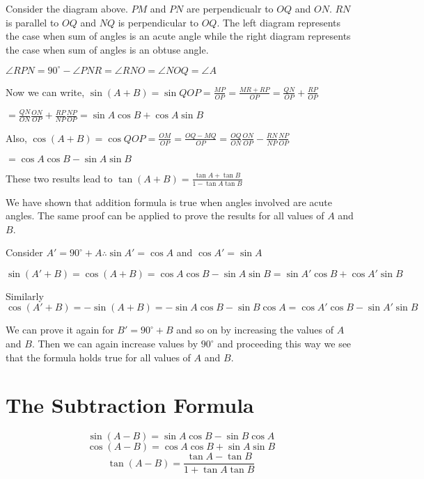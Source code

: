 Consider the diagram above. $PM$ and $PN$ are perpendicualr to $OQ$ and $ON$. $RN$ is parallel to
$OQ$ and $NQ$ is perpendicular to $OQ$. The left diagram represents the case when sum of angles is an acute angle
while the right diagram represents the case when sum of angles is an obtuse angle.

$\angle RPN = 90^{\circ} - \angle PNR = \angle RNO = \angle NOQ = \angle A$

Now we can write, $\sin(A + B) = \sin QOP = \frac{MP}{OP} = \frac{MR + RP}{OP} = \frac{QN}{OP} + \frac{RP}{OP}$

$=\frac{QN}{ON}\frac{ON}{OP} + \frac{RP}{NP}\frac{NP}{OP} = \sin A\cos B + \cos A\sin B$

Also, $\cos(A + B) = \cos QOP = \frac{OM}{OP} = \frac{OQ - MQ}{OP} = \frac{OQ}{ON}\frac{ON}{OP} - \frac{RN}{NP}\frac{NP}{OP}$

$= \cos A\cos B - \sin A\sin B$

These two results lead to $\tan (A + B) = \frac{\tan A + \tan B}{1 - \tan A\tan B}$

We have shown that addition formula is true when angles involved are acute angles. The same proof can be applied to prove the
results for all values of $A$ and $B$.

Consider $A' = 90^{\circ} + A \therefore \sin A' = \cos A$ and $\cos A' = \sin A$

$\sin(A' + B) = \cos (A + B) = \cos A\cos B - \sin A\sin B = \sin A'\cos B + \cos A'\sin B$

Similarly $\cos(A' + B) = -\sin(A + B) = -\sin A\cos B - \sin B\cos A = \cos A'\cos B - \sin A'\sin B$

We can prove it again for $B' = 90^{\circ} + B$ and so on by increasing the values of $A$ and $B$. Then we can
again increase values by $90^{\circ}$ and proceeding this way we see that the formula holds true for all values of $A$
and $B$.

\section{The Subtraction Formula}
$$\sin(A - B) = \sin A\cos B - \sin B\cos A$$
$$\cos(A - B) = \cos A\cos B + \sin A\sin B$$
$$\tan(A - B) = \frac{\tan A - \tan B}{1 + \tan A\tan B}$$


